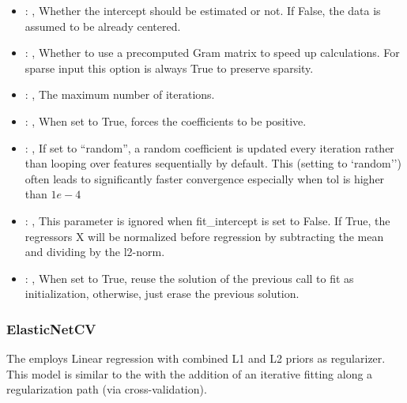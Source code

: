 \begin{itemize}
    \item {}: , 
      Whether the intercept should be estimated or not. If False,
      the data is assumed to be already centered.

    \item {}: , 
      Whether to use a precomputed Gram matrix to speed up calculations.
      For sparse input this option is always True to preserve sparsity.

    \item {}: , 
      The maximum number of iterations.

    \item {}: , 
      When set to True, forces the coefficients to be positive.

    \item {}: , 
      If set to ``random'', a random coefficient is updated every iteration
      rather than looping over features sequentially by default. This (setting to `random'')
      often leads to significantly faster convergence especially when tol is higher than $1e-4$

    \item {}: , 
      This parameter is ignored when fit\_intercept is set to False. If True,
      the regressors X will be normalized before regression by subtracting the mean and
      dividing by the l2-norm.

    \item {}: , 
      When set to True, reuse the solution of the previous call
      to fit as initialization, otherwise, just erase the previous solution.
  \end{itemize}


\subsubsection{ElasticNetCV}
  The  employs                         Linear regression with combined L1 and
  L2 priors as regularizer.                         This model is similar to the
                           with the addition of an iterative fitting along a
  regularization path (via cross-validation).

